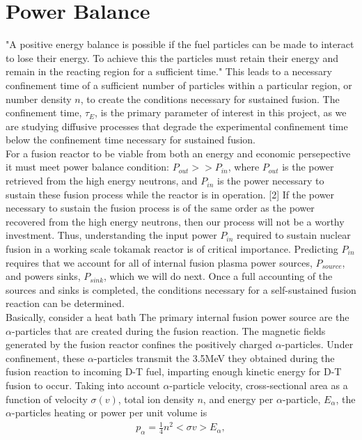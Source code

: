 \documentclass{article}
\begin{document}
\section{Power Balance}
 "A positive energy balance is possible if the fuel particles can be made to interact to lose their energy. To achieve this the particles must retain their energy and remain in the reacting region for a sufficient time." This leads to a necessary confinement time of a sufficient number of particles within a particular region, or number density $n$, to create the conditions necessary for sustained fusion. The confinement time, $\tau_E$, is the primary parameter of interest in this project, as we are studying diffusive processes that degrade the experimental confinement time below the confinement time necessary for sustained fusion.\\
For a fusion reactor to be viable from both an energy and economic persepective it must meet power balance condition: $P_{out} >> P_{in}$, where $P_{out}$ is the power retrieved from the high energy neutrons, and $P_{in}$ is the power necessary to sustain these fusion process while the reactor is in operation. [2] If the power necessary to sustain the fusion process is of the same order as the power recovered from the high energy neutrons, then our process will not be a worthy investment. Thus, understanding the input power $P_{in}$ required to sustain nuclear fusion in a working scale tokamak reactor is of critical importance. Predicting $P_{in}$ requires that we account for all of internal fusion plasma power sources, $P_{source}$, and powers sinks, $P_{sink}$, which we will do next. Once a full accounting of the sources and sinks is completed, the conditions necessary for a self-sustained fusion reaction can be determined. \\
Basically, consider a heat bath
The primary internal fusion power source are the $\alpha$-particles that are created during the fusion reaction. The magnetic fields generated by the fusion reactor confines the positively charged $\alpha$-particles. Under confinement, these $\alpha$-particles transmit the 3.5MeV they obtained during the fusion reaction to incoming D-T fuel, imparting enough kinetic energy for D-T fusion to occur. Taking into account $\alpha$-particle velocity, cross-sectional area as a function of velocity $\sigma(v)$, total ion density $n$, and energy per $\alpha$-particle, $E_{\alpha}$, the $\alpha$-particles heating or power per unit volume is
\begin{align*}
p_{\alpha} = \frac{1}{4} n^2 <\sigma v> E_{\alpha},
\end{align*}
\end{document}

